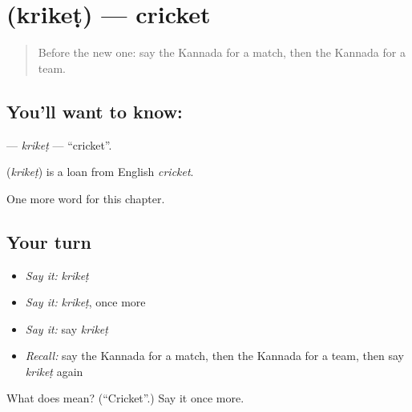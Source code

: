 \section[\texorpdfstring{\kn{ಕ್ರಿಕೆಟ್} (krikeṭ)}{ಕ್ರಿಕೆಟ್ (krikeṭ)}]{ (krikeṭ) — cricket}

\label{lesson:KA-C191-kriket}



\begin{quote}
Before the new one: say the Kannada for a match, then the Kannada for a team.
\end{quote}

\subsection*{You'll want to know: }
\textbf{} — \emph{krikeṭ} — \textquotedblleft{}cricket\textquotedblright{}.

\begin{cousinweb}
\textbf{} (\emph{krikeṭ}) is a loan from English \emph{cricket}.
\end{cousinweb}

\begin{grammarlens}[title={What you've built}]
One more word for this chapter.
\end{grammarlens}

\subsection*{Your turn}
\begin{itemize}
\raggedright
  \item \emph{Say it:} \emph{krikeṭ}
  \item \emph{Say it:} \emph{krikeṭ}, once more
  \item \emph{Say it:} say \emph{krikeṭ}
  \item \emph{Recall:} say the Kannada for a match, then the Kannada for a team, then say \emph{krikeṭ} again
\end{itemize}

\begin{tcolorbox}[breakable,colback=teal!4,colframe=teal!35!black,title={Before you move on}]
What does  mean? (\textquotedblleft{}Cricket\textquotedblright{}.) Say it once more.
\end{tcolorbox}
